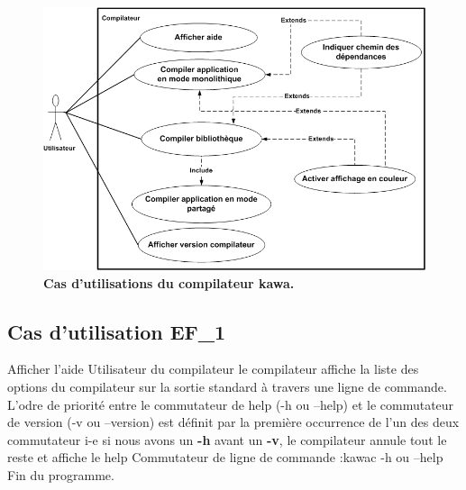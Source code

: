 \begin{figure}
  \centering
  \includegraphics[scale=0.8]{../res/stb/vs_finale_usecase.jpg}
  \caption{\textbf{Cas d'utilisations du compilateur kawa.}}
\end{figure}

\subsection{Cas d'utilisation EF\_1}
\fiche
{Afficher l'aide}                    %
{Utilisateur du compilateur}                               %
{                                                %
  le compilateur affiche 
   la liste des options du compilateur sur la sortie standard à travers une ligne de commande.
}
{
  L'odre de priorité entre le commutateur de help (-h ou --help) et le commutateur de version (-v ou --version) est définit par la première occurrence de l'un des deux commutateur i-e si nous avons un \textbf {-h} avant un \textbf {-v}, le compilateur annule tout le reste et affiche le help 
}                                                %
{Commutateur de ligne de commande :kawac -h ou --help}                             %
{Fin du programme.}                       %
{} %
{} %
{} %

